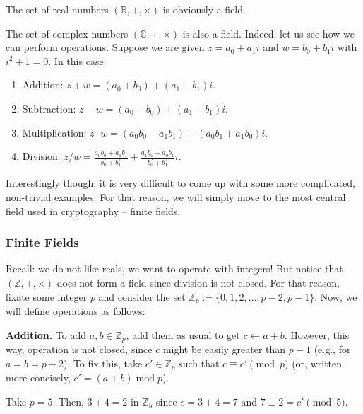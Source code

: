 \documentclass[../lecture-notes.tex]{subfiles}
\begin{document}
\begin{example}
    The set of real numbers $(\mathbb{R}, +, \times)$ is obviously a field.
\end{example}

\begin{example}
    The set of complex numbers $(\mathbb{C}, +, \times)$ is also a field. Indeed, let us see how we can perform operations. Suppose we are given $z = a_0 + a_1i$ and $w = b_0 + b_1i$ with $i^2+1=0$. In this case:
    \begin{enumerate}
        \item Addition: $z + w = (a_0 + b_0) + (a_1 + b_1)i$.
        \item Subtraction: $z - w = (a_0 - b_0) + (a_1 - b_1)i$.
        \item Multiplication: $z \cdot w = (a_0b_0 - a_1b_1) + (a_0b_1 + a_1b_0)i$.
        \item Division: $z / w = \frac{a_0b_0 + a_1b_1}{b_0^2 + b_1^2} + \frac{a_1b_0 - a_0b_1}{b_0^2 + b_1^2}i$.
    \end{enumerate}
\end{example}

Interestingly though, it is very difficult to come up with some more complicated, non-trivial examples. For that reason, we will simply move to the most central field used in cryptography -- finite fields.

\subsubsection{Finite Fields}
Recall: we do not like reals, we want to operate with integers! But notice that $(\mathbb{Z},+,\times)$ does not form a field since division is not closed. For that reason, fixate some integer $p$ and consider the set $\mathbb{Z}_p := \{0,1,2,\dots,p-2,p-1\}$. Now, we will define operations as follows:

\textbf{Addition.} To add $a,b \in \mathbb{Z}_p$, add them as usual to get $c \gets a+b$. However, this way, operation is not closed, since $c$ might be easily greater than $p-1$ (e.g., for $a=b=p-2$). To fix this, take $c' \in \mathbb{Z}_p$ such that $c \equiv c' \pmod{p}$ (or, written more concisely, $c' = (a+b) \;\text{mod} \; p$). 

\begin{example}
    Take $p=5$. Then, $3+4 = 2$ in $\mathbb{Z}_5$ since $c=3+4=7$ and $7 \equiv 2 = c' \pmod{5}$.
\end{example}
\end{document}
